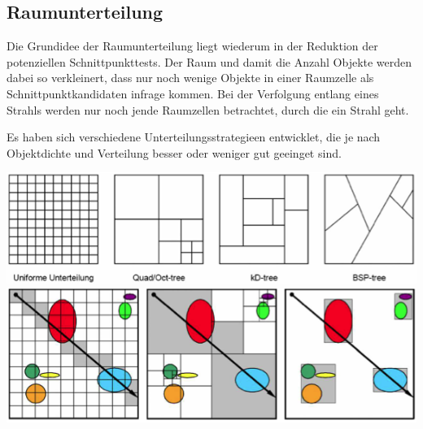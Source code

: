 \documentclass[10pt]{article}
\begin{document}
\subsection{Raumunterteilung}
Die Grundidee der Raumunterteilung liegt wiederum in der Reduktion der potenziellen Schnittpunkttests. Der Raum und damit  die Anzahl Objekte werden dabei so verkleinert, dass nur noch wenige Objekte in einer Raumzelle als Schnittpunktkandidaten infrage kommen. Bei der Verfolgung entlang eines Strahls werden nur noch jende Raumzellen betrachtet, durch die ein Strahl geht. 

Es haben sich verschiedene Unterteilungsstrategieen entwicklet, die je nach Objektdichte und Verteilung besser oder weniger gut geeinget sind.
\begin{center}
	\includegraphics[scale=0.5]{raumunterteilung.png}
	\includegraphics[scale=0.5]{schnitttest.png}
\end{center}

\end{document}
